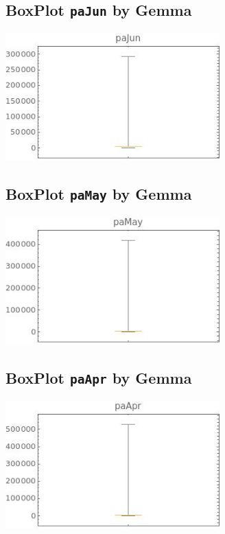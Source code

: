 \documentclass[a4paper]{article}
\begin{document}
\subsection{BoxPlot {\tt paJun} by Gemma}
\includegraphics[width=0.62\textwidth]{imgs/paJun.jpeg}

\subsection{BoxPlot {\tt paMay} by Gemma}
\includegraphics[width=0.62\textwidth]{imgs/paMay.jpeg}

\subsection{BoxPlot {\tt paApr} by Gemma}
\includegraphics[width=0.62\textwidth]{imgs/paApr.jpeg}























\end{document}
